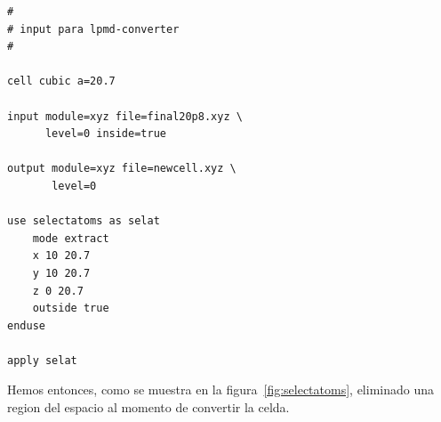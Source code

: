\begin{multicols}{2}
\setlength{\columnseprule}{.5pt}
\begin{verbatim}
#
# input para lpmd-converter
#

cell cubic a=20.7

input module=xyz file=final20p8.xyz \
      level=0 inside=true

output module=xyz file=newcell.xyz \
       level=0

use selectatoms as selat
    mode extract
    x 10 20.7
    y 10 20.7
    z 0 20.7
    outside true
enduse

apply selat
\end{verbatim}
\end{multicols}

Hemos entonces, como se muestra en la figura~\ref{fig:selectatoms}, eliminado una region del espacio al momento de convertir la celda.

